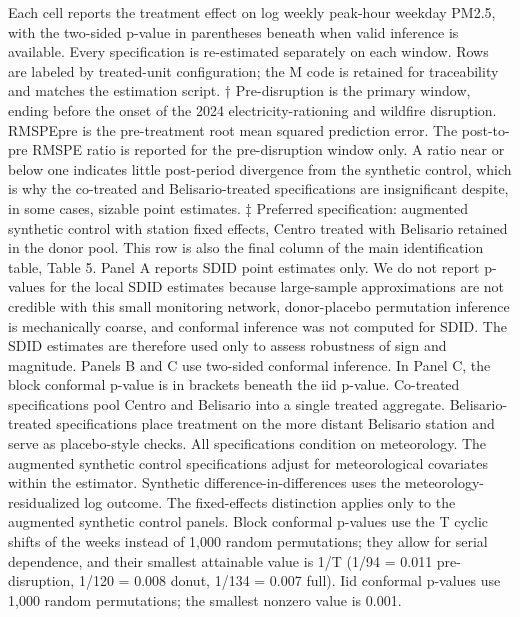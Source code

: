 \begin{table}[htbp]
\begin{threeparttable}
\begin{tablenotes}
\item Each cell reports the treatment effect on log weekly peak-hour weekday PM2.5, with the two-sided p-value in parentheses beneath when valid inference is available. Every specification is re-estimated separately on each window. Rows are labeled by treated-unit configuration; the M code is retained for traceability and matches the estimation script. † Pre-disruption is the primary window, ending before the onset of the 2024 electricity-rationing and wildfire disruption. RMSPEpre is the pre-treatment root mean squared prediction error. The post-to-pre RMSPE ratio is reported for the pre-disruption window only. A ratio near or below one indicates little post-period divergence from the synthetic control, which is why the co-treated and Belisario-treated specifications are insignificant despite, in some cases, sizable point estimates. ‡ Preferred specification: augmented synthetic control with station fixed effects, Centro treated with Belisario retained in the donor pool. This row is also the final column of the main identification table, Table 5. Panel A reports SDID point estimates only. We do not report p-values for the local SDID estimates because large-sample approximations are not credible with this small monitoring network, donor-placebo permutation inference is mechanically coarse, and conformal inference was not computed for SDID. The SDID estimates are therefore used only to assess robustness of sign and magnitude. Panels B and C use two-sided conformal inference. In Panel C, the block conformal p-value is in brackets beneath the iid p-value. Co-treated specifications pool Centro and Belisario into a single treated aggregate. Belisario-treated specifications place treatment on the more distant Belisario station and serve as placebo-style checks. All specifications condition on meteorology. The augmented synthetic control specifications adjust for meteorological covariates within the estimator. Synthetic difference-in-differences uses the meteorology-residualized log outcome. The fixed-effects distinction applies only to the augmented synthetic control panels. Block conformal p-values use the T cyclic shifts of the weeks instead of 1,000 random permutations; they allow for serial dependence, and their smallest attainable value is 1/T (1/94 = 0.011 pre-disruption, 1/120 = 0.008 donut, 1/134 = 0.007 full). Iid conformal p-values use 1,000 random permutations; the smallest nonzero value is 0.001.
\end{tablenotes}
\end{threeparttable}
\end{table}
